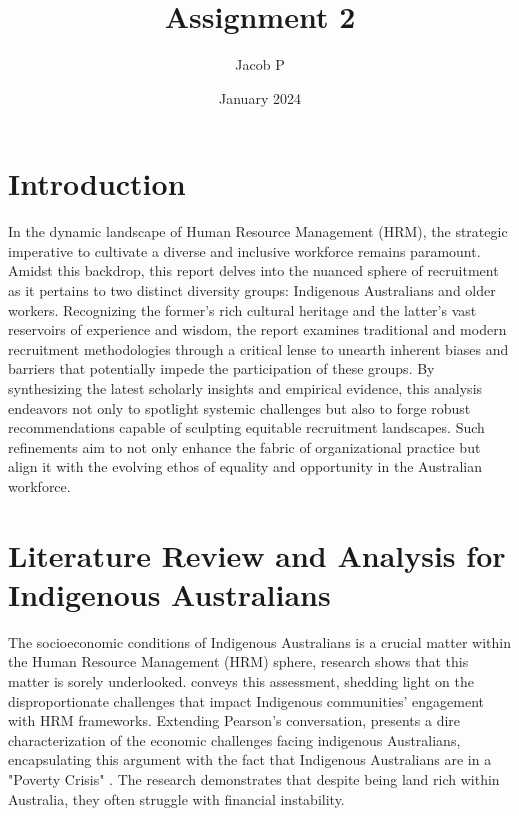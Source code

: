 \documentclass{article}
\title{Assignment 2}
\author{Jacob P }
\date{January 2024}
\begin{document}
\maketitle

\section{Introduction}
In the dynamic landscape of Human Resource Management (HRM), the strategic imperative to cultivate a diverse and inclusive workforce remains paramount. Amidst this backdrop, this report delves into the nuanced sphere of recruitment as it pertains to two distinct diversity groups: Indigenous Australians and older workers. Recognizing the former's rich cultural heritage and the latter's vast reservoirs of experience and wisdom, the report examines traditional and modern recruitment methodologies through a critical lense to unearth inherent biases and barriers that potentially impede the participation of these groups. By synthesizing the latest scholarly insights and empirical evidence, this analysis endeavors not only to spotlight systemic challenges but also to forge robust recommendations capable of sculpting equitable recruitment landscapes. Such refinements aim to not only enhance the fabric of organizational practice but align it with the evolving ethos of equality and opportunity in the Australian workforce.

\section{Literature Review and Analysis for Indigenous Australians}
The socioeconomic conditions of Indigenous Australians is a crucial matter within the Human Resource Management (HRM) sphere, research shows that this matter is sorely underlooked. \cite{pearsonExtendingBoundariesHuman2011} conveys this assessment, shedding light on the disproportionate challenges that impact Indigenous communities' engagement with HRM frameworks. Extending Pearson's conversation, \cite{podgerEnduringChallengesNew2017} presents a dire characterization of the economic challenges facing indigenous Australians, encapsulating this argument with the fact that Indigenous Australians are in a "Poverty Crisis" \parencite{podgerEnduringChallengesNew2017}. The research demonstrates that despite being land rich within Australia, they often struggle with financial instability.
\end{document}
